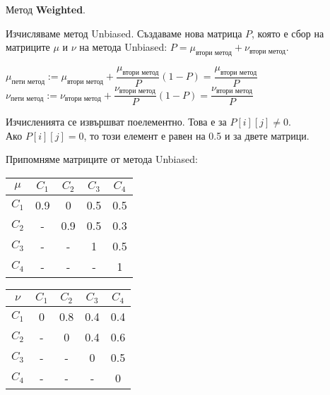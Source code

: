 \documentclass{beamer}
\begin{document}
\begin{frame}
Метод \textbf{Weighted}.

\bigskip
Изчисляваме метод Unbiased.
Създаваме нова матрица $P$, която е сбор на матриците $\mu$ и $\nu$ на метода Unbiased:
$P = \mu_{\text{втори метод}} + \nu_{\text{втори метод}}$.

\bigskip
$\mu_{\text{пети метод}} := \mu_{\text{втори метод}} + \dfrac{\mu_{\text{втори метод}}}{P}(1 - P) = \dfrac{\mu_{\text{втори метод}}}{P}$
$\nu_{\text{пети метод}} := \nu_{\text{втори метод}} + \dfrac{\nu_{\text{втори метод}}}{P}(1 - P) = \dfrac{\nu_{\text{втори метод}}}{P}$

\bigskip
Изчисленията се извършват поелементно. Това е за $P[i][j] \neq 0$.\\
Ако $P[i][j] = 0$, то този елемент е равен на 0.5 и за двете матрици.

\bigskip
Припомняме матриците от метода Unbiased:
\begin{center}
\begin{minipage}[b]{0.4\linewidth}
\begin{tabular}{c|cccc}
$\mu$ & $C_1$ & $C_2$ & $C_3$ & $C_4$ \\
\hline $C_1$ & 0.9 & 0 & 0.5 & 0.5 \\
$C_2$ & - & 0.9 & 0.5 & 0.3 \\
$C_3$ & - & - & 1 & 0.5 \\
$C_4$ & - & - & - & 1
\end{tabular}
\end{minipage}
\begin{minipage}[b]{0.4\linewidth}
\begin{tabular}{c|cccc}
$\nu$ & $C_1$ & $C_2$ & $C_3$ & $C_4$ \\
\hline $C_1$ & 0 & 0.8 & 0.4 & 0.4 \\
$C_2$ & - & 0 & 0.4 & 0.6 \\
$C_3$ & - & - & 0 & 0.5 \\
$C_4$ & - & - & - & 0
\end{tabular}
\end{minipage}
\end{center}
\end{frame}
\end{document}
